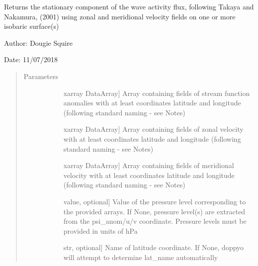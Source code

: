 \documentclass[letterpaper,10pt,english]{sphinxmanual}
\begin{document}

\begin{fulllineitems}
\label{\detokenize{diagnostic_doc:diagnostic.wave_activity_flux}}
Returns the stationary component of the wave activity flux, following Takaya and Nakamura,                 (2001) using zonal and meridional velocity fields on one or more isobaric surface(s)

\begin{DUlineblock}{0em}
\item[] Author: Dougie Squire
\item[] Date: 11/07/2018
\end{DUlineblock}
\begin{quote}\begin{description}
\item[{Parameters}] \leavevmode\begin{description}
\item[{}] \leavevmode{[}xarray DataArray{]}
Array containing fields of stream function anomalies with at least coordinates latitude                     and longitude (following standard naming - see Notes)

\item[{}] \leavevmode{[}xarray DataArray{]}
Array containing fields of zonal velocity with at least coordinates latitude and longitude                     (following standard naming - see Notes)

\item[{}] \leavevmode{[}xarray DataArray{]}
Array containing fields of meridional velocity with at least coordinates latitude and                     longitude (following standard naming - see Notes)

\item[{}] \leavevmode{[}value, optional{]}
Value of the pressure level corresponding to the provided arrays. If None, pressure                     level(s) are extracted from the psi\_anom/u/v coordinate. Pressure levels must be provided                     in units of hPa

\item[{}] \leavevmode{[}str, optional{]}
Name of latitude coordinate. If None, doppyo will attempt to determine lat\_name                     automatically


\end{description}
\end{description}
\end{quote}
\end{fulllineitems}
\end{document}
